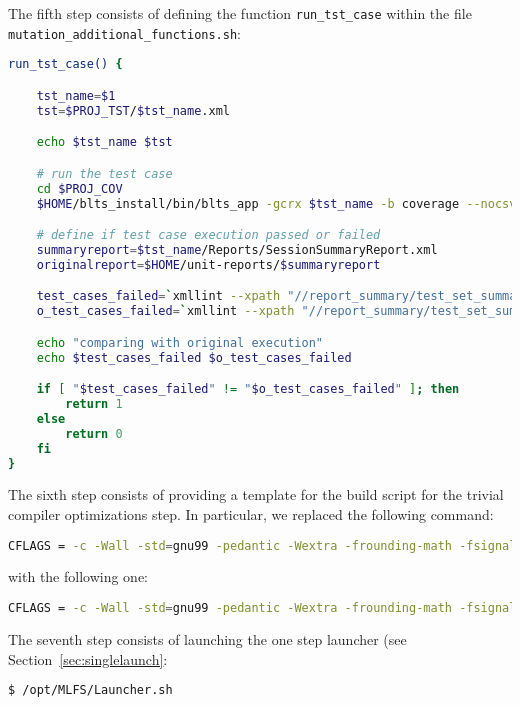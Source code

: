 The fifth step consists of defining the function \texttt{run\_tst\_case} within the file \\\texttt{mutation\_additional\_functions.sh}:

\begin{lstlisting}[language=bash]
run_tst_case() {

    tst_name=$1
    tst=$PROJ_TST/$tst_name.xml

    echo $tst_name $tst

    # run the test case
    cd $PROJ_COV
    $HOME/blts_install/bin/blts_app -gcrx $tst_name -b coverage --nocsv -s $tst

    # define if test case execution passed or failed
    summaryreport=$tst_name/Reports/SessionSummaryReport.xml
    originalreport=$HOME/unit-reports/$summaryreport

    test_cases_failed=`xmllint --xpath "//report_summary/test_set_summary/test_cases_failed/text()" $summaryreport`
    o_test_cases_failed=`xmllint --xpath "//report_summary/test_set_summary/test_cases_failed/text()" $originalreport`

    echo "comparing with original execution" 
    echo $test_cases_failed $o_test_cases_failed 

    if [ "$test_cases_failed" != "$o_test_cases_failed" ]; then
        return 1
    else
        return 0
    fi
}
\end{lstlisting}

The sixth step consists of providing a template for the build script for the trivial compiler optimizations step. In particular, we replaced the following command: 

\begin{lstlisting}[language=bash]
CFLAGS = -c -Wall -std=gnu99 -pedantic -Wextra -frounding-math -fsignaling-nans -g O2 -fno-builtin $(EXTRA_CFLAGS)
\end{lstlisting}

with the following one:

\begin{lstlisting}[language=bash]
CFLAGS = -c -Wall -std=gnu99 -pedantic -Wextra -frounding-math -fsignaling-nans TCE -fno-builtin $(EXTRA_CFLAGS)
\end{lstlisting}

The seventh step consists of launching the one step launcher (see Section~\ref{sec:singlelaunch}:

\begin{lstlisting}[language=bash]
 $ /opt/MLFS/Launcher.sh
\end{lstlisting}

